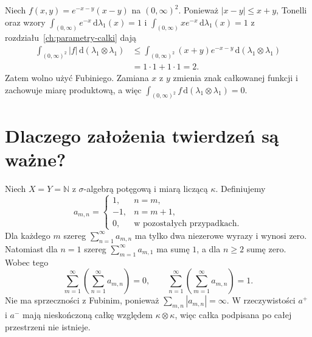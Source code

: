 \begin{przyklad}
Niech $f(x,y)=e^{-x-y}(x-y)$ na $(0,\infty)^2$.
Ponieważ $|x-y|\le x+y$, Tonelli oraz wzory
$\int_{(0,\infty)}e^{-x}\,\mathrm d\lambda_1(x)=1$ i
$\int_{(0,\infty)}xe^{-x}\,\mathrm d\lambda_1(x)=1$
z rozdziału~\ref{ch:parametry-calki} dają
\begin{align*}
\int_{(0,\infty)^2}|f|\,
\mathrm d(\lambda_1\otimes\lambda_1)
&\le\int_{(0,\infty)^2}(x+y)e^{-x-y}
\,\mathrm d(\lambda_1\otimes\lambda_1)\\
&=1\cdot1+1\cdot1=2.
\end{align*}
Zatem wolno użyć Fubiniego. Zamiana $x$ z $y$
zmienia znak całkowanej funkcji i zachowuje
miarę produktową, a więc
$\int_{(0,\infty)^2}f\,\mathrm d(\lambda_1\otimes\lambda_1)=0$.
\end{przyklad}

\section{Dlaczego założenia twierdzeń są ważne?}

\begin{przyklad}
\label{ex:nonabs-fubini-12}
Niech $X=Y=\mathbb N$ z $\sigma$-algebrą potęgową
i miarą liczącą $\kappa$. Definiujemy
\[
a_{m,n}=\begin{cases}
1,&n=m,\\
-1,&n=m+1,\\
0,&\text{w pozostałych przypadkach}.
\end{cases}
\]
Dla każdego $m$ szereg $\sum_{n=1}^\infty a_{m,n}$
ma tylko dwa niezerowe wyrazy i wynosi zero. Natomiast
dla $n=1$ szereg $\sum_{m=1}^\infty a_{m,1}$
ma sumę $1$, a dla $n\ge2$ sumę zero.
Wobec tego
\[
\sum_{m=1}^\infty\left(\sum_{n=1}^\infty a_{m,n}\right)=0,
\qquad
\sum_{n=1}^\infty\left(\sum_{m=1}^\infty a_{m,n}\right)=1.
\]
Nie ma sprzeczności z Fubinim, ponieważ
$\sum_{m,n}|a_{m,n}|=\infty$.
W rzeczywistości $a^+$ i $a^-$ mają nieskończoną
całkę względem $\kappa\otimes\kappa$, więc
całka podpisana po całej przestrzeni nie istnieje.
\end{przyklad}

